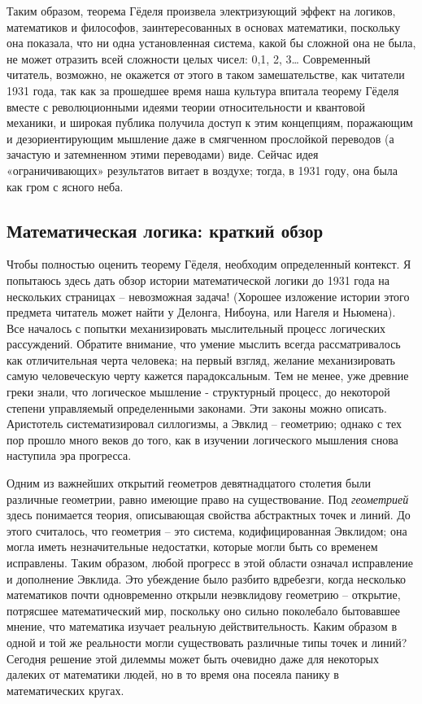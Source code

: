 \documentclass[../main.tex]{subfiles}
\begin{document}
Таким образом, теорема Гёделя произвела электризующий эффект на логиков, математиков и философов, заинтересованных в основах математики, поскольку она показала, что ни одна установленная система, какой бы сложной она не была, не может отразить всей сложности целых чисел: 0,1, 2, 3\ldots{} Современный читатель, возможно, не окажется от этого в таком замешательстве, как читатели 1931 года, так как за прошедшее время наша культура впитала теорему Гёделя вместе с революционными идеями теории относительности и квантовой механики, и широкая публика получила доступ к этим концепциям, поражающим и дезориентирующим мышление даже в смягченном прослойкой переводов (а зачастую и затемненном этими переводами) виде. Сейчас идея «ограничивающих» результатов витает в воздухе; тогда, в 1931 году, она была как гром с ясного неба.


\subsection{Математическая логика: краткий обзор}

Чтобы полностью оценить теорему Гёделя, необходим определенный контекст. Я попытаюсь здесь дать обзор истории математической логики до 1931 года на нескольких страницах \--- невозможная задача! (Хорошее изложение истории этого предмета читатель может найти у Делонга, Нибоуна, или Нагеля и Ньюмена). Все началось с попытки механизировать мыслительный процесс логических рассуждений. Обратите внимание, что умение мыслить всегда рассматривалось как отличительная черта человека; на первый взгляд, желание механизировать самую человеческую черту кажется парадоксальным. Тем не менее, уже древние греки знали, что логическое мышление - структурный процесс, до некоторой степени управляемый определенными законами. Эти законы можно описать. Аристотель систематизировал силлогизмы, а Эвклид \--- геометрию; однако с тех пор прошло много веков до того, как в изучении логического мышления снова наступила эра прогресса.

Одним из важнейших открытий геометров девятнадцатого столетия были различные геометрии, равно имеющие право на существование. Под \emph{геометрией} здесь понимается теория, описывающая свойства абстрактных точек и линий. До этого считалось, что геометрия \--- это система, кодифицированная Эвклидом; она могла иметь незначительные недостатки, которые могли быть со временем исправлены. Таким образом, любой прогресс в этой области означал исправление и дополнение Эвклида. Это убеждение было разбито вдребезги, когда несколько математиков почти одновременно открыли неэвклидову геометрию \--- открытие, потрясшее математический мир, поскольку оно сильно поколебало бытовавшее мнение, что математика изучает реальную действительность. Каким образом в одной и той же реальности могли существовать различные типы точек и линий? Сегодня решение этой дилеммы может быть очевидно даже для некоторых далеких от математики людей, но в то время она посеяла панику в математических кругах.
\end{document}
